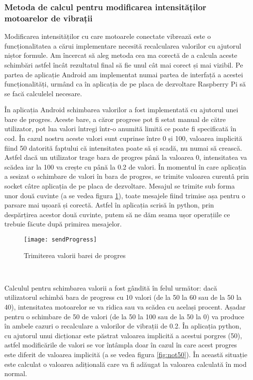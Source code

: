 \documentclass[../IoMusT.tex]{subfiles}
\begin{document}
\subsubsection{Metoda de calcul pentru modificarea intensităților motoarelor de vibrații}
Modificarea intensităților cu care motoarele conectate vibrează este o funcționalitatea a cărui implementare necesită recalcularea valorilor cu ajutorul niștor formule. Am încercat să aleg metoda cea ma corectă de a calcula aceste schimbări astfel încât rezultatul final să fie unul cât mai corect și mai vizibil. Pe partea de aplicație Android am implementat numai partea de interfață a acestei funcționalități, urmând ca în aplicația de pe placa de dezvoltare Raspberry Pi să se facă calculelel necesare.
\\ %
\par În aplicația Android schimbarea valorilor a fost implementată cu ajutorul unei bare de progres. Aceste bare, a căror progrese pot fi setat manual de către utilizator, pot lua valori întregi într-o anumită limită ce poate fi specificată în cod. În cazul nostru aceste valori sunt cuprinse între 0 și 100, valoarea implicită fiind 50 datorită faptului că intensitatea poate să și scadă, nu numai să crească. Astfel dacă un utilizator trage bara de progres până la valoarea 0, intensitatea va scădea iar la 100 va crește cu până la 0.2 de valori. În momentul în care aplicația a sesizat o schimbare de valori în bara de progres, se trimite valoarea curentâ prin socket câtre aplicația de pe placa de dezvoltare. Mesajul se trimite sub forma unor două cuvinte (a se vedea figura \ref{fig:sendProgress}), toate mesajele fiind trimise așa pentru o parsare mai ușoară și corectă. Astfel în aplicația scrisă în python, prin despărțirea acestor două cuvinte, putem să ne dăm seama ușor operațiile ce trebuie făcute după primirea mesajelor.
\begin{figure}[h]
\centering
\texttt{[image: sendProgress]}
\caption{Trimiterea valorii barei de progres}
\label{fig:sendProgress}
\end{figure} 
\\
\par Calculul pentru schimbarea valorii a fost gândită în felul următor: dacă utilizatorul schimbă bara de progress cu 10 valori (de la 50 la 60 sau de la 50 la 40), intensitatea motoarelor se va ridica sau va scădea cu același procent. Așadar pentru o schimbare de 50 de valori (de la 50 la 100 sau de la 50 la 0) va produce în ambele cazuri o recalculare a valorilor de vibrații de 0.2. În aplicația python, cu ajutorul unui dicționar este păstrat valoarea implicită a acestui porgres (50), astfel modificările de valori se vor întâmpla doar în cazul în care acest progres este diferit de valoarea implicită (a se vedea figura \ref{fig:not50}). În această situație este calculat o valoarea adițională care va fi adăugat la valoarea calculată în mod normal.
\end{document}
